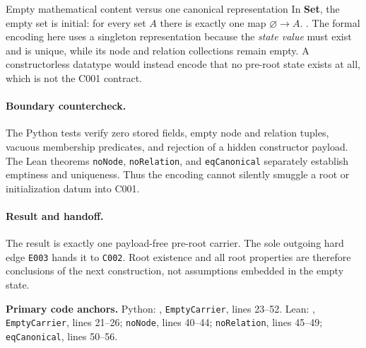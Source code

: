 \begin{cnnaInfoBox}{Empty mathematical content versus one canonical representation}
In \textbf{Set}, the empty set is initial: for every set $A$ there is exactly
one map $\varnothing\to A$.
\cite[Chs.~I and III, categories and universal constructions]{MacLane1998Categories}.
The formal encoding here uses a singleton representation because the
\emph{state value} must exist and is unique, while its node and relation
collections remain empty.  A constructorless datatype would instead encode
that no pre-root state exists at all, which is not the C001 contract.
\end{cnnaInfoBox}

\paragraph*{Boundary countercheck.}
The Python tests verify zero stored fields, empty node and relation tuples,
vacuous membership predicates, and rejection of a hidden constructor payload.
The Lean theorems \texttt{noNode}, \texttt{noRelation}, and
\texttt{eqCanonical} separately establish emptiness and uniqueness.  Thus the
encoding cannot silently smuggle a root or initialization datum into C001.

\paragraph*{Result and handoff.}
The result is exactly one payload-free pre-root carrier.  The sole outgoing
hard edge \texttt{E003} hands it to \texttt{C002}.  Root existence and all
root properties are therefore conclusions of the next construction, not
assumptions embedded in the empty state.

\noindent\textbf{Primary code anchors.}
Python: ,
\texttt{EmptyCarrier}, lines 23--52.  Lean:
,
\texttt{EmptyCarrier}, lines 21--26; \texttt{noNode}, lines 40--44;
\texttt{noRelation}, lines 45--49; \texttt{eqCanonical}, lines 50--56.
